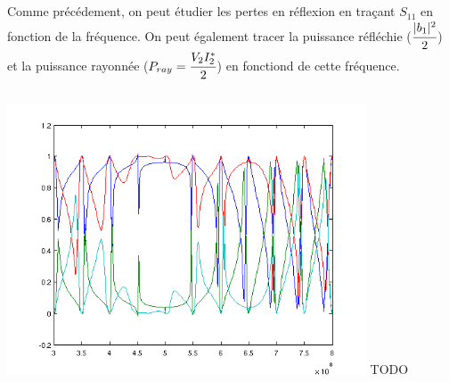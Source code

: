 \documentclass[10pt]{article}
\begin{document}
\subsection{}
Comme précédement, on peut étudier les pertes en réflexion en traçant $S_{11}$ en fonction de la fréquence. On peut également tracer la puissance réfléchie ($\cfrac{|b_1|^2}{2}$) et la puissance rayonnée ($P_{ray} = \cfrac{V_2I_2^\ast}{2}$) en fonctiond de cette fréquence.

\inputminted[linenos]{matlab}{src/2c.m}
\includegraphics[width=\linewidth,height=8cm]{img/2c} TODO
\end{document}
